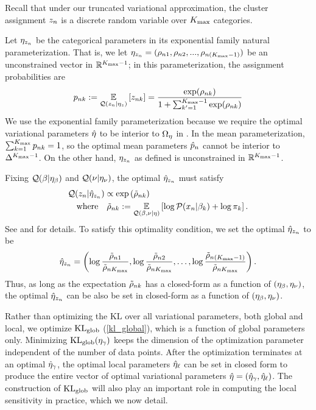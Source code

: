 \begin{ex}
Recall that under our truncated variational approximation,
the cluster assignment $z_n$ is a discrete random variable
over ${K_{\mathrm{max}}}$ categories.

Let $\eta_{z_n}$ be the categorical parameters in its
exponential family natural parameterization.
That is, we let $\eta_{z_n} = (\rho_{n1}, \rho_{n2}, ..., \rho_{n({K_{\mathrm{max}}}-1)})$
be an unconstrained vector in $\mathbb{R}^{{K_{\mathrm{max}}}-1}$;
in this parameterization, the assignment probabilities are
%
\begin{align*}
  p_{nk} := \underset{\mathcal{Q}(z_n \vert \eta_{z})}{\mathbb{E}}\left[z_{nk}\right] =
  \frac{\exp(\rho_{nk})}{1 + \sum_{k'=1}^{{K_{\mathrm{max}}}-1}\exp(\rho_{nk})}
\end{align*}
%
We use the exponential family parameterization because
we require the optimal variational parameters $\hat\eta$
to be interior to $\Omega_{\eta}$ in .
In the mean parameterization,
$\sum_{k=1}^{K_{\mathrm{max}}} p_{nk} = 1$, so the
optimal mean parameters $\hat p_{n}$ cannot be
interior to $\Delta^{{K_{\mathrm{max}}} - 1}$.
On the other hand, $\eta_{z_n}$ as defined
is unconstrained in $\mathbb{R}^{{K_{\mathrm{max}}} - 1}$.

Fixing $\mathcal{Q}(\beta\vert\eta_{\beta})$ and $\mathcal{Q}(\nu\vert\eta_{\nu})$,
the optimal $\hat\eta_{z_n}$ must satisfy
%
\begin{align*}
& \mathcal{Q}(z_n | \hat\eta_{z_n}) \propto \exp\left(\tilde \rho_{nk}\right)\\
& \quad\textrm{where}\quad \tilde \rho_{nk} := \underset{\mathcal{Q}(\beta, \nu \vert \eta)}{\mathbb{E}}\left[\log \mathcal{P}(x_n \vert \beta_k) + \log \pi_k\right].
\end{align*}
%
See \citet{bishop:2006:PRML} and \citet{blei:2017:vi_review} for details.
To satisfy this optimality condition,
we set the optimal $\hat\eta_{z_n}$ to be
%
\begin{align*}
%
\etaopt_{\z_\n} = \left(\log\frac{\tilde\rho_{\n1}}{\tilde\rho_{\n\kmax}},
\log\frac{\tilde\rho_{\n2}}{\tilde\rho_{\n\kmax}}, \ldots,
\log\frac{\tilde\rho_{\n(\kmax-1)}}{\tilde\rho_{\n\kmax}}\right).
%
\end{align*}
%
Thus, as long as the expectation $\tilde\rho_{nk}$ has a closed-form as a function of
$(\eta_{\beta}, \eta_{\nu})$, the optimal $\hat\eta_{z_n}$ can be also be set in closed-form as
a function of $(\eta_{\beta}, \eta_{\nu})$.
%
\end{ex}

Rather than optimizing the $\mathrm{KL}$ over all variational parameters, both global and local,
we optimize $\mathrm{KL}_{\mathrm{glob}}$ (\eqref{kl_global}), which is a function of global parameters only.
Minimizing $\mathrm{KL}_{\mathrm{glob}}(\eta_{\gamma})$ keeps the
dimension of the optimization parameter independent of the number of data points.
After the optimization terminates at an optimal $\hat\eta_{\gamma}$,
the optimal local parameters $\hat\eta_{\ell}$ can be set in closed form
to produce the entire vector of optimal variational parameters $\hat\eta = (\hat\eta_{\gamma}, \hat\eta_{\ell})$.
The construction of $\mathrm{KL}_{\mathrm{glob}}$ will also play an
important role in computing the local sensitivity in practice,
which we now detail.


